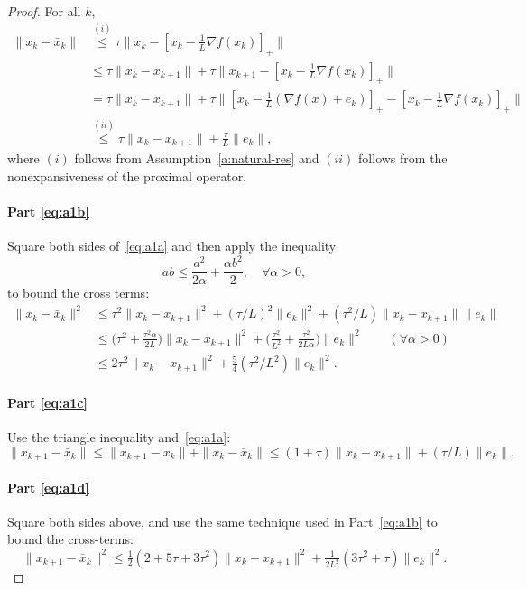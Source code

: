 \begin{proof}
 For all $k$,
\begin{align*}
\|x_{k}-\bar{x}_k\|
  &\overset{(i)}{\leq}\tau\|x_{k}
  - [x_{k}-\tfrac{1}{L}\nabla f(x_{k})]_{+}\|
\\&\leq
    \tau \|x_{k}-x_{k+1}\|
  + \tau \|x_{k+1}
  - [x_{k}-\tfrac{1}{L}\nabla f(x_{k})]_{+}\|
\\&=\tau \|x_{k}-x_{k+1}\|
  + \tau \|[x_{k}-\tfrac{1}{L}(\nabla f(x)+e_{k})]_{+}
          -[x_{k}-\tfrac{1}{L}\nabla f(x_{k})]_{+}\|
\\& \overset{(ii)}{\leq}\tau\|x_{k}-x_{k+1}\|+\tfrac{\tau}{L}\|e_{k}\|,
\end{align*}
where $(i)$ follows from Assumption~\eqref{a:natural-res} and $(ii)$
follows from the nonexpansiveness of the proximal operator.

\paragraph{\bf Part \eqref{eq:a1b}}Square both sides of~\eqref{eq:a1a}
and then apply the inequality
\begin{equation}\label{eq:crossterm}
ab\leq\frac{a^{2}}{2\alpha}+\frac{\alpha b^{2}}{2},
\quad \forall\alpha>0,
\end{equation}
to bound the cross terms:
\begin{align*}
  \|x_{k}-\bar{x}_k\|^{2}
  & \leq\tau^{2}\|x_{k}-x_{k+1}\|^{2}
  +(\tau/L)^{2}\|e_{k}\|^{2}+(\tau^{2}/L)\|x_{k}-x_{k+1}\|\|e_{k}\|
\\& \leq\big(\tau^{2}
  +\tfrac{\tau^{2}\alpha}{2L}\big)\|x_{k}-x_{k+1}\|^{2}
  +\big(\tfrac{\tau^{2}}{L^{2}}
  +\tfrac{\tau^{2}}{2L\alpha}\big)\|e_{k}\|^{2}\qquad(\forall\alpha>0)
\\& \leq2\tau^{2}\|x_{k}-x_{k+1}\|^{2}
  +\tfrac{5}{4}(\tau^{2}/L^{2})\|e_{k}\|^{2}.
\end{align*}

\paragraph{\bf Part \eqref{eq:a1c}} Use the triangle inequality
and~\eqref{eq:a1a}:
\[
  \|x_{k+1}-\bar{x}_k\|
  \leq\|x_{k+1}-x_{k}\|+\|x_{k}-\bar{x}_k\|
  \leq(1+\tau)\|x_{k}-x_{k+1}\|+(\tau/L)\|e_{k}\|.
\]

\paragraph{\bf Part \eqref{eq:a1d}} Square both sides above, and use the
same technique used in Part~\eqref{eq:a1b} to bound the cross-terms:
\[
  \|x_{k+1}-\bar{x}_k\|^{2}
  \leq\tfrac{1}{2}(2+5\tau+3\tau^{2})\|x_{k}
  -x_{k+1}\|^{2}+\tfrac{1}{2L^{2}}(3\tau^{2}+\tau)\|e_{k}\|^{2}.
\]
\end{proof}

